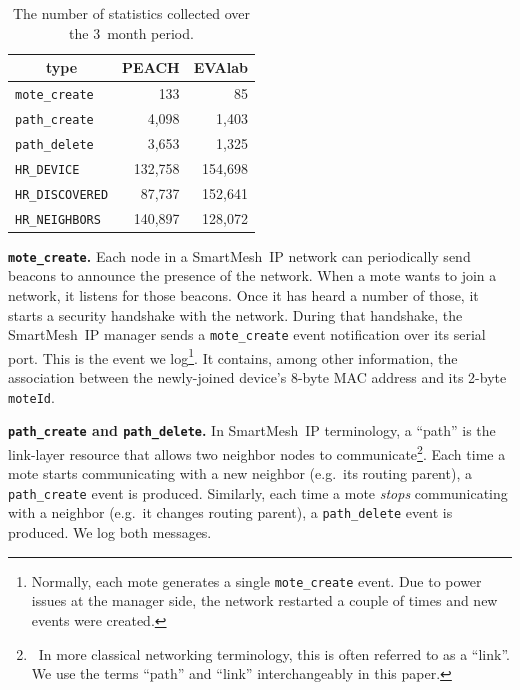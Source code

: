 \documentclass{elsarticle}
\newcommand{\smip}                {SmartMesh~IP\xspace}
\newcommand{\HRNEIGHBORS}         {{\tt HR\_NEIGHBORS}\xspace}
\newcommand{\HRDISCOVERED}        {{\tt HR\_DISCOVERED}\xspace}
\newcommand{\HRDEVICE}            {{\tt HR\_DEVICE}\xspace}
\newcommand{\pathcreate}          {{\tt path\_create}\xspace}
\newcommand{\pathdelete}          {{\tt path\_delete}\xspace}
\newcommand{\motecreate}          {{\tt mote\_create}\xspace}
\newcommand{\moteId}              {{\tt moteId}\xspace}
\newcommand{\PEACHNUMHRNEIGHBORS} {140,897\xspace}
\newcommand{\EVANUMHRNEIGHBORS}   {128,072\xspace}
\begin{document}
\begin{table}
    \centering
    \begin{tabular}{|l|r|r|}
        \toprule
        \multicolumn{1}{|c|}{type} & \multicolumn{1}{|c|}{PEACH} & \multicolumn{1}{|c|}{EVAlab} \\ \hline
        \hline
        \motecreate     &     133     &   85 \\ \hline
        \pathcreate     &   4,098     &   1,403 \\ \hline
        \pathdelete     &   3,653     &   1,325 \\ \hline
        \HRDEVICE       & 132,758     &   154,698 \\ \hline
        \HRDISCOVERED   &  87,737     &   152,641 \\ \hline
        \HRNEIGHBORS    & \PEACHNUMHRNEIGHBORS & \EVANUMHRNEIGHBORS\\ \hline
    \end{tabular}
    \caption{The number of statistics collected over the 3~month period.}
    \label{tab:msg_stats}
\end{table}

\textbf{\motecreate.}
Each node in a \smip network can periodically send beacons to announce the presence of the network.
When a mote wants to join a network, it listens for those beacons.
Once it has heard a number of those, it starts a security handshake with the network.
During that handshake, the \smip manager sends a \motecreate event notification over its serial port.
This is the event we log\footnote{Normally, each mote generates a single \motecreate event. Due to power issues at the manager side, the network restarted a couple of times and new events were created.}.
It contains, among other information, the association between the newly-joined device's 8-byte MAC address and its 2-byte \moteId.

\textbf{\pathcreate and \pathdelete.}
In \smip terminology, a ``path'' is the link-layer resource that allows two neighbor nodes to communicate\footnote{~In more classical networking terminology, this is often referred to as a ``link''. We use the terms ``path'' and ``link'' interchangeably in this paper.}.
Each time a mote starts communicating with a new neighbor (e.g.~its routing parent), a \pathcreate event is produced.
Similarly, each time a mote \textit{stops} communicating with a neighbor (e.g.~it changes routing parent), a \pathdelete event is produced.
We log both messages.
\end{document}
